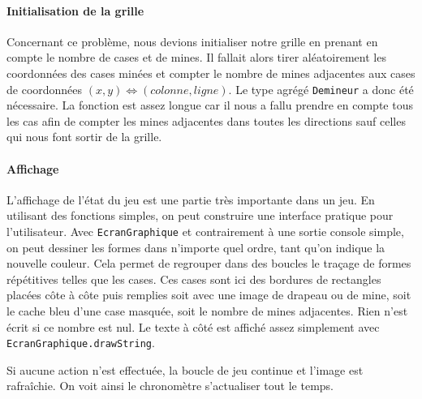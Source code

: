 \documentclass[a4paper, 12pt, oneside]{article}
\newcommand{\var}[1]{\texttt{#1}}
\begin{document}
\paragraph{Initialisation de la grille} Concernant ce problème, nous devions initialiser notre grille en prenant en compte le nombre de cases et de mines. Il fallait alors tirer aléatoirement les coordonnées des cases minées et compter le nombre de mines adjacentes aux cases de coordonnées $(x,y) \iff (colonne, ligne)$. Le type agrégé \var{Demineur} a donc été nécessaire. La fonction est assez longue car il nous a fallu prendre en compte tous les cas afin de compter les mines adjacentes dans toutes les directions sauf celles qui nous font sortir de la grille.

\paragraph{Affichage} L'affichage de l'état du jeu est une partie très importante dans un jeu. En utilisant des fonctions simples, on peut construire une interface pratique pour l'utilisateur. Avec \var{EcranGraphique} et contrairement à une sortie console simple, on peut dessiner les formes dans n'importe quel ordre, tant qu'on indique la nouvelle couleur. Cela permet de regrouper dans des boucles le traçage de formes répétitives telles que les cases. Ces cases sont ici des bordures de rectangles placées côte à côte puis remplies soit avec une image de drapeau ou de mine, soit le cache bleu d'une case masquée, soit le nombre de mines adjacentes. Rien n'est écrit si ce nombre est nul. Le texte à côté est affiché assez simplement avec \var{EcranGraphique.drawString}.

Si aucune action n'est effectuée, la boucle de jeu continue et l'image est rafraîchie. On voit ainsi le chronomètre s'actualiser tout le temps.
\end{document}
